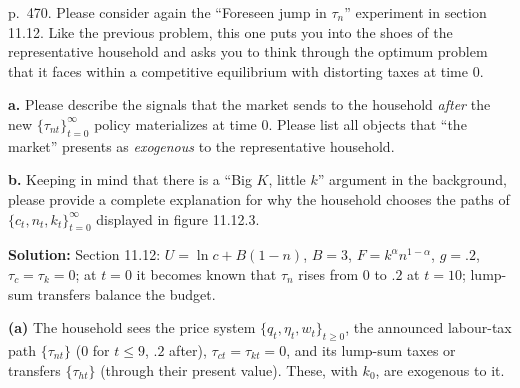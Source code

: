 \documentclass[12pt, letterpaper]{article}
\begin{document}
\begin{tcolorbox}[evenbox,title={Exercise 11.20 \quad The invisible hand, II}]
\begin{tcolorbox}[questionbox]
p.~470. Please consider again the ``Foreseen jump in $\tau_n$'' experiment in section 11.12. Like the previous problem,
this one puts you into the shoes of the representative household and asks you to think through the optimum problem that
it faces within a competitive equilibrium with distorting taxes at time 0.

\textbf{a.} Please describe the signals that the market sends to the household \emph{after} the new
$\{\tau_{nt}\}_{t=0}^\infty$ policy materializes at time 0. Please list all objects that ``the market'' presents as
\emph{exogenous} to the representative household.

\textbf{b.} Keeping in mind that there is a ``Big $K$, little $k$'' argument in the background, please provide a complete
explanation for why the household chooses the paths of $\{c_t,n_t,k_t\}_{t=0}^\infty$ displayed in figure 11.12.3.
\end{tcolorbox}

\textbf{Solution:} Section 11.12: $U=\ln c+B(1-n)$, $B=3$, $F=k^\alpha n^{1-\alpha}$, $g=.2$, $\tau_c=\tau_k=0$; at $t=0$
it becomes known that $\tau_n$ rises from 0 to $.2$ at $t=10$; lump-sum transfers balance the budget.

\textbf{(a)} The household sees the price system $\{q_t,\eta_t,w_t\}_{t\ge0}$, the announced labour-tax path
$\{\tau_{nt}\}$ (0 for $t\le9$, $.2$ after), $\tau_{ct}=\tau_{kt}=0$, and its lump-sum taxes or transfers $\{\tau_{ht}\}$
(through their present value). These, with $k_0$, are exogenous to it.


\end{tcolorbox}
\end{document}
